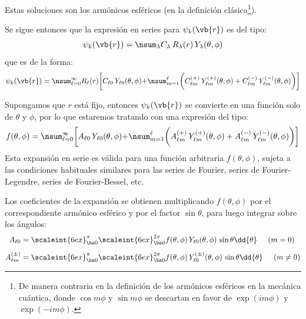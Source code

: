 Estas soluciones son los armónicos esféricos (en la definición clásica\footnote{De manera contraria en la definición de los armónicos esféricos en la mecánica cuántica, donde $\cos m \phi$ y $\sin m \phi$ se descartan en favor de $\exp(i m \phi)$ y $\exp(-i m \phi)$.}).
\par
Se sigue entonces que la expresión en series para $\psi_{k} (\vb{r})$ es del tipo:
\begin{align*}
\psi_{k} (\vb{r}) = \nsum_{\lambda} C_{\lambda} \, R_{\lambda} (r) \, Y_{\lambda} (\theta, \phi)
\end{align*}
que es de la forma:
\begin{align*}
\psi_{k} (\vb{r}) = \nsum_{\ell=0}^{\infty} R_{\ell} (r) \bigg[ C_{\ell 0} \, Y_{\ell 0} (\theta, \phi) {+} \nsum_{m=1}^{\ell} \bigg( C_{\ell m}^{(+)} \, Y_{\ell m}^{(+)} (\theta, \phi) + C_{\ell m}^{(-)} \, Y_{\ell m}^{(-)} (\theta, \phi) \bigg) \bigg]
\end{align*}

Supongamos que $r$ está fijo, entonces $\psi_{k} (\vb{r})$ se convierte en una función solo de $\theta$ y $\phi$, por lo que estaremos tratando con una expresión del tipo:
\begin{align*}
f (\theta, \phi) = \nsum_{\ell=0}^{\infty} \bigg[ A_{\ell 0} \, Y_{\ell 0} (\theta, \phi) {+} \nsum_{m=1}^{\ell} \bigg( A_{\ell m}^{(+)} \, Y_{\ell m}^{(+)} (\theta, \phi) + A_{\ell m}^{(-)} \, Y_{\ell m}^{(-)} (\theta, \phi) \bigg) \bigg]
\end{align*}
Esta expansión en serie es válida para una función arbitraria $f (\theta, \phi)$, sujeta a las condiciones habituales similares para las series de Fourier, series de Fourier-Legendre, series de Fourier-Bessel, etc.
\par
Los coeficientes de la expansión se obtienen multiplicando $f (\theta, \phi)$ por el correspondiente armónico esférico y por el factor $\sin \theta$, para luego integrar sobre los ángulos:
\begin{align*}
A_{\ell 0} &= \scaleint{6ex}_{\bs 0}^{\pi} \scaleint{6ex}_{\bs 0}^{2 \pi} f (\theta, \phi) \, Y_{\ell 0} (\theta, \phi) \, \sin \theta \dd{\theta} \hspace{0.5cm} (m = 0) \\[0.5em] 
A_{\ell m}^{(\pm)} &= \scaleint{6ex}_{\bs 0}^{\pi} \scaleint{6ex}_{\bs 0}^{2 \pi} f (\theta, \phi) \, Y_{\ell 0}^{(\pm)} (\theta, \phi) \, \sin \theta \dd{\theta} \hspace{0.5cm} (m \neq 0)
\end{align*}

